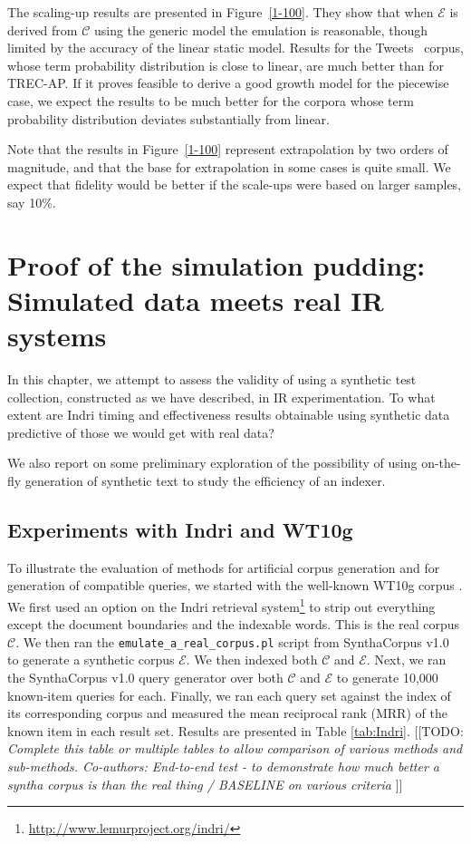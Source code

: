 \documentclass[11pt]{report}
\newcommand{\todo}[1]{{\color{blue}[[TODO: {\emph{#1}}]]}}
\newcommand{\script}[1]{$\mathcal{#1}$}
\newcommand{\TRECAP}{TREC-AP}
\newcommand{\Tweets}{Tweets}
\begin{document}
The scaling-up results are presented in Figure~\ref{1-100}.
They show that when \script{E} is derived from \script{C} using the
generic model the emulation is reasonable, though limited by the
accuracy of the linear static model.  Results for the \Tweets~ corpus,
whose term probability distribution is close to linear, are much
better than for \TRECAP.  If it proves feasible to derive
a good growth model for the piecewise case, we expect the results
to be much better for the corpora whose term probability distribution 
deviates substantially from linear. 

Note that the results in Figure~\ref{1-100} represent extrapolation
by two orders of magnitude, and that the base for extrapolation in 
some cases is quite small.  We expect that fidelity would be better
if the scale-ups were based on larger samples, say 10\%.





\chapter{Proof of the simulation pudding: Simulated data meets real IR systems}   %
\label{chap:practicalities}

In this chapter, we attempt to assess the validity of using a
synthetic test collection, constructed as we have described, in IR
experimentation. To what extent are Indri timing and effectiveness results
obtainable using synthetic data predictive of those we would get with
real data?

We also report on some preliminary exploration of the possibility of
using on-the-fly generation of synthetic text to study the efficiency
of an indexer.


\section{Experiments with Indri and WT10g}
To illustrate the evaluation of methods for artificial corpus
generation and for generation of compatible queries, we started with the
well-known WT10g corpus \cite{BaileyCH03}.  We first used an option on the
Indri retrieval
system\footnote{\url{http://www.lemurproject.org/indri/}} to strip out
everything except the document boundaries and the indexable words.
This is the real corpus \script{C}.   We then ran the
\texttt{emulate\_a\_real\_corpus.pl} script from SynthaCorpus v1.0 to
generate a synthetic corpus \script{E}.  We then indexed both
\script{C} and \script{E}.
Next, we ran the SynthaCorpus
v1.0 query generator over both \script{C} and \script{E} to generate
10,000 known-item queries for each.   Finally, we ran each query set
against the index of its corresponding corpus and measured the mean
reciprocal rank (MRR) of the known item in each result set.   Results
are presented in Table \ref{tab:Indri}.
\todo{Complete this table or multiple tables to allow comparison of
  various methods and sub-methods. Co-authors: 	End-to-end test -
  to demonstrate how much better a syntha corpus is than the real thing / BASELINE on various criteria
}
\end{document}
